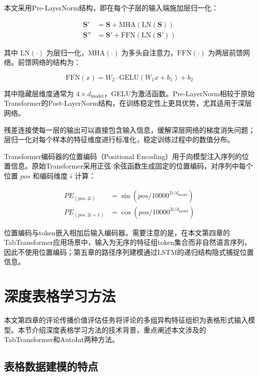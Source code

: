 本文采用Pre-LayerNorm结构\cite{xiong2020layer}，即在每个子层的输入端施加层归一化：

\begin{align}
\mathbf{S}' &= \mathbf{S} + \text{MHA}(\text{LN}(\mathbf{S})) \\
\mathbf{S}'' &= \mathbf{S}' + \text{FFN}(\text{LN}(\mathbf{S}'))
\end{align}

其中 $\text{LN}(\cdot)$ 为层归一化，$\text{MHA}(\cdot)$ 为多头自注意力，$\text{FFN}(\cdot)$ 为两层前馈网络。前馈网络的结构为：

\begin{equation}
\text{FFN}(x) = W_2 \cdot \text{GELU}(W_1 x + b_1) + b_2
\end{equation}

其中隐藏层维度通常为 $4 \times d_{\text{model}}$，GELU为激活函数。Pre-LayerNorm相较于原始Transformer的Post-LayerNorm结构，在训练稳定性上更具优势，尤其适用于深层网络。

残差连接使每一层的输出可以直接包含输入信息，缓解深层网络的梯度消失问题；层归一化对每个样本的特征维度进行标准化，稳定训练过程中的数值分布。

Transformer编码器的位置编码（Positional Encoding）用于向模型注入序列的位置信息。原始Transformer采用正弦-余弦函数生成固定的位置编码，对序列中每个位置 $pos$ 和编码维度 $i$ 计算：

\begin{align}
PE_{(pos, 2i)} &= \sin(pos / 10000^{2i/d_{\text{model}}}) \\
PE_{(pos, 2i+1)} &= \cos(pos / 10000^{2i/d_{\text{model}}})
\end{align}

位置编码与token嵌入相加后输入编码器。需要注意的是，在本文第四章的TabTransformer应用场景中，输入为无序的特征组token集合而非自然语言序列，因此不使用位置编码；第五章的路径序列建模通过LSTM的递归结构隐式捕捉位置信息。

\section{深度表格学习方法}

本文第四章的评论传播价值评估任务将评论的多组异构特征组织为表格形式输入模型。本节介绍深度表格学习方法的技术背景，重点阐述本文涉及的TabTransformer和AutoInt两种方法。

\subsection{表格数据建模的特点}


